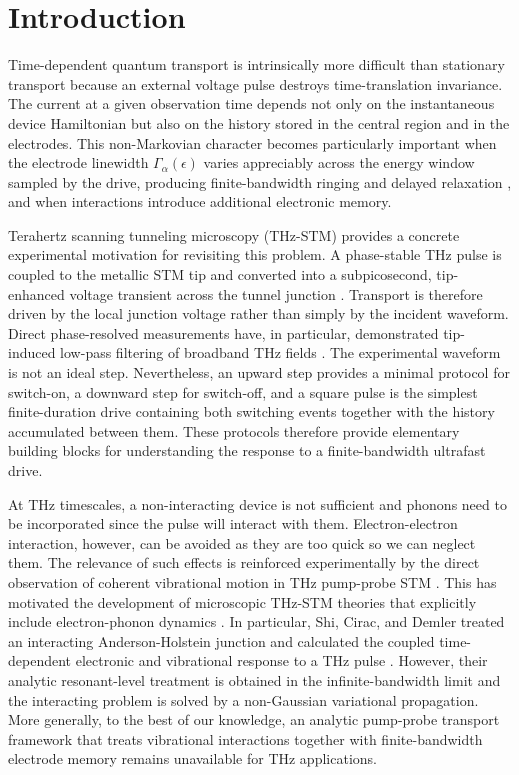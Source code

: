 \documentclass[
 reprint,
 superscriptaddress,
 amsmath,amssymb,
 aps,prb,
 longbibliography,
 floatfix
]{revtex4-2}
\begin{document}
\maketitle

\section{Introduction}
\label{sec:intro}

Time-dependent quantum transport is intrinsically more difficult than stationary transport because an external voltage pulse destroys time-translation invariance. The current at a given observation time depends not only on the instantaneous device Hamiltonian but also on the history stored in the central region and in the electrodes. This non-Markovian character becomes particularly important when the electrode linewidth $\Gamma_\alpha(\epsilon)$ varies appreciably across the energy window sampled by the drive, producing finite-bandwidth ringing and delayed relaxation \cite{MaciejkoWangGuo2006,JauhoWingreenMeir1994}, and when interactions introduce additional electronic memory.

Terahertz scanning tunneling microscopy (THz-STM) provides a concrete experimental motivation for revisiting this problem. A phase-stable THz pulse is coupled to the metallic STM tip and converted into a subpicosecond, tip-enhanced voltage transient across the tunnel junction \cite{Cocker2013}. Transport is therefore driven by the local junction voltage rather than simply by the incident waveform. Direct phase-resolved measurements have, in particular, demonstrated tip-induced low-pass filtering of broadband THz fields \cite{Luo2020,Muller2020}. The experimental waveform is not an ideal step. Nevertheless, an upward step provides a minimal protocol for switch-on, a downward step for switch-off, and a square pulse is the simplest finite-duration drive containing both switching events together with the history accumulated between them. These protocols therefore provide elementary building blocks for understanding the response to a finite-bandwidth ultrafast drive.

At THz timescales, a non-interacting device is not sufficient and phonons need to be incorporated since the pulse will interact with them. Electron-electron interaction, however, can be avoided as they are too quick so we can neglect them. The relevance of such effects is reinforced experimentally by the direct observation of coherent vibrational motion in THz pump-probe STM \cite{Rai2025}. This has motivated the development of microscopic THz-STM theories that explicitly include electron-phonon dynamics \cite{Ammerman2022,BanerjeeZhang2022}. In particular, Shi, Cirac, and Demler treated an interacting Anderson-Holstein junction and calculated the coupled time-dependent electronic and vibrational response to a THz pulse \cite{ShiCiracDemler2020}. However, their analytic resonant-level treatment is obtained in the infinite-bandwidth limit and the interacting problem is solved by a non-Gaussian variational propagation. More generally, to the best of our knowledge, an analytic pump-probe transport framework that treats vibrational interactions together with finite-bandwidth electrode memory remains unavailable for THz applications.
\end{document}
